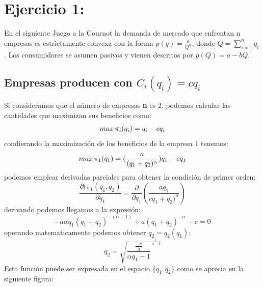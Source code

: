 \documentclass{article}
\begin{document}



\section{Ejercicio 1:}

En el siguiente Juego a la Cournot la demanda de mercado que enfrentan n empresas es estrictamente convexa con la forma
$p(q)=\frac{a}{Q^\alpha}$, donde $Q=\sum_{i=1}^n q_i$. Los consumidores se asumen pasivos y vienen descritos por $p(Q)=a-bQ$.

\subsection{Empresas producen con $C_i(q_i)=cq_i$}
Si consideramos que el n\'umero de empresas \textbf{n} es 2, podemos calcular las cantidades que maximizan sus beneficios como:
 $$max\thinspace \pi_i(q_i)=q_i-cq_i$$
 condierando la maximizaci\'on de los beneficios de la empresa 1 tenemos:
 $$max\thinspace \pi_1(q_1)=(\frac{a}{(q_1+q_2)^\alpha})q_1-cq_1$$
podemos emplear derivadas parciales para obtener la condici\'on de primer orden:
  $$\frac{\partial(\pi_1(q_1,q_2)}{\partial q_1} = \frac{\partial}{\partial q_1} (\frac{aq_1}{cq_1+q_2)^\alpha})$$
  derivando podemos llegamos a la expresi\'on:
  $$-a\alpha q_1(q_1+q_2)^{-(\alpha+1)}+a(q_1+q_2)^{-\alpha}-c=0$$
  operando matematicamente podemos obtener $q_2=q_2(q_1)$:
$$q_2=\sqrt{\frac{\frac{-c}{a}}{\alpha q_1-1}}^{\frac{1}{\alpha-1}}$$
Esta funci\'on puede ser expresada en el espacio \{$q_1,q_2$\} como se aprecia en la siguiente figura:
\end{document}

